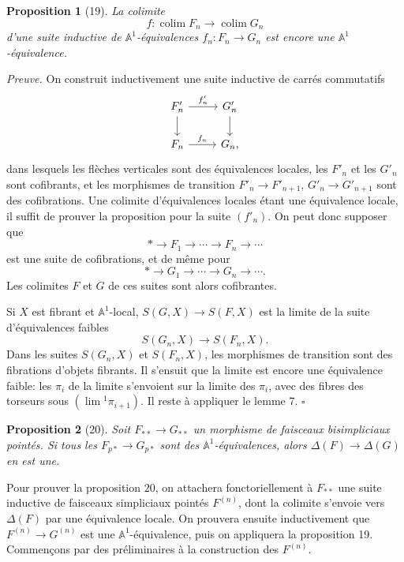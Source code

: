\documentclass[11pt]{article}
\newcommand{\Aone}{\mathbb A^1}
\theoremstyle{deligne}
\newtheorem*{proposition*}{Proposition}
\newenvironment{proofdel}{\noindent\textit{Preuve.}}{\hfill$\square$}
\newcommand{\colim}{\operatorname{colim}}
\newcommand{\limi}{\operatorname{lim}}
\begin{document}
\begin{proposition*}[19]
La colimite
\[
f:\colim F_n\longrightarrow\colim G_n
\]
d'une suite inductive de \(\Aone\)-équivalences \(f_n:F_n\to G_n\) est encore une \(\Aone\)-équivalence.
\end{proposition*}

\begin{proofdel}
On construit inductivement une suite inductive de carrés commutatifs
\[
\begin{tikzcd}[column sep=2.5em,row sep=1.8em]
F'_n \arrow[r,"f'_n"] \arrow[d] & G'_n \arrow[d] \\
F_n \arrow[r,"f_n"] & G_n,
\end{tikzcd}
\]
dans lesquels les flèches verticales sont des équivalences locales, les \(F'_n\) et les \(G'_n\) sont cofibrants, et les morphismes de transition \(F'_n\to F'_{n+1}\), \(G'_n\to G'_{n+1}\) sont des cofibrations. Une colimite d'équivalences locales étant une équivalence locale, il suffit de prouver la proposition pour la suite \((f'_n)\). On peut donc supposer que
\[
*\longrightarrow F_1\longrightarrow\cdots\longrightarrow F_n\longrightarrow\cdots
\]
est une suite de cofibrations, et de même pour
\[
*\longrightarrow G_1\longrightarrow\cdots\longrightarrow G_n\longrightarrow\cdots.
\]
Les colimites \(F\) et \(G\) de ces suites sont alors cofibrantes.

Si \(X\) est fibrant et \(\Aone\)-local, \(S(G,X)\to S(F,X)\) est la limite de la suite d'équivalences faibles
\[
S(G_n,X)\longrightarrow S(F_n,X).
\]
Dans les suites \(S(G_n,X)\) et \(S(F_n,X)\), les morphismes de transition sont des fibrations d'objets fibrants. Il s'ensuit que la limite est encore une équivalence faible: les \(\pi_i\) de la limite s'envoient sur la limite des \(\pi_i\), avec des fibres des torseurs sous \((\limi{}^1\pi_{i+1})\). Il reste à appliquer le lemme 7.
\end{proofdel}

\begin{proposition*}[20]
Soit \(F_{**}\to G_{**}\) un morphisme de faisceaux bisimpliciaux pointés. Si tous les \(F_{p*}\to G_{p*}\) sont des \(\Aone\)-équivalences, alors \(\Delta(F)\to\Delta(G)\) en est une.
\end{proposition*}

Pour prouver la proposition 20, on attachera fonctoriellement à \(F_{**}\) une suite inductive de faisceaux simpliciaux pointés \(F^{(n)}\), dont la colimite s'envoie vers \(\Delta(F)\) par une équivalence locale. On prouvera ensuite inductivement que \(F^{(n)}\to G^{(n)}\) est une \(\Aone\)-équivalence, puis on appliquera la proposition 19. Commençons par des préliminaires à la construction des \(F^{(n)}\).
\end{document}
